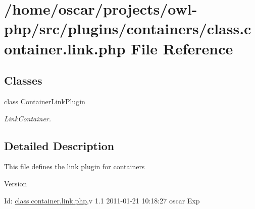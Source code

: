 \section{/home/oscar/projects/owl-\/php/src/plugins/containers/class.container.link.php File Reference}
\label{class_8container_8link_8php}
\subsection*{Classes}
\begin{DoxyCompactItemize}
\item 
class \hyperlink{classContainerLinkPlugin}{ContainerLinkPlugin}
\begin{DoxyCompactList}\small\item\em LinkContainer. \item\end{DoxyCompactList}\end{DoxyCompactItemize}


\subsection{Detailed Description}
This file defines the link plugin for containers \begin{DoxyVersion}{Version}

\end{DoxyVersion}
\begin{DoxyParagraph}{Id:}
\hyperlink{class_8container_8link_8php}{class.container.link.php},v 1.1 2011-\/01-\/21 10:18:27 oscar Exp 
\end{DoxyParagraph}
